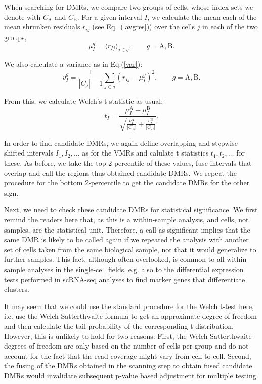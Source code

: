 \documentclass[twocolumn,10pt]{article}
\begin{document}
When searching for DMRs, we compare two groups of cells, whose index sets we denote with $C_\text{A}$ and $C_\text{B}$.
For a given interval $I$, we calculate the mean each of the mean shrunken residuals $r_{ij}$ (see Eq.~(\ref{avgres})) over the cells $j$ in each of the two groups,
\[ \mu^g_I = \langle r_{Ij} \rangle_{j\in g},\qquad g=\text{A},\text{B}. \]

We also calculate a variance as in Eq.(\ref{var}):
\[ v^g_I = \frac{1}{|C_\text{g}|-1}  \sum_{j\in g} \left( r_{Ij} - \mu_I^g \right)^2, 
\qquad g=\text{A},\text{B}.\]

From this, we calculate Welch's t statistic as usual:
\[ t_I = \frac{\mu^\text{A}_I - \mu^\text{B}_I}{\sqrt{\frac{v^\text{A}_I}{|C_A|} + \frac{v^\text{B}_I}{|C_B|}}}.\]

In order to find candidate DMRs, we again define overlapping and stepwise shifted intervals $I_1, I_2, \dots$ as for the VMRs and calulate t statistics $t_1, t_2, \dots$ for these.
As before, we take the top 2-percentile of these values, fuse intervals that overlap and call the regions thus obtained candidate DMRs.
We repeat the procedure for the bottom 2-percentile to get the candidate DMRs for the other sign.

Next, we need to check these candidate DMRs for statistical significance.
We first remind the readers here that, as this is a within-sample analysis, and cells, not samples, are the statistical unit.
Therefore, a call as significant implies that the same DMR is likely to be called again if we repeated the analysis with another set of cells taken from the same biological sample, not that it would generalize to further samples.
This fact, although often overlooked, is common to all within-sample analyses in the single-cell fields, e.g. also to the differential expression tests performed in scRNA-seq analyses to find marker genes that differentiate clusters.

It may seem that we could use the standard procedure for the Welch t-test here, i.e. use the Welch-Satterthwaite formula to get an approximate degree of freedom and then calculate the tail probability of the corresponding t distribution.
However, this is unlikely to hold for two reasons:
First, the Welch-Satterthwaite degrees of freedom are only based on the number of cells per group and do not account for the fact that the read coverage might vary from cell to cell.
Second, the fusing of the DMRs obtained in the scanning step to obtain fused candidate DMRs would invalidate subsequent p-value based adjustment for multiple testing.
\end{document}
